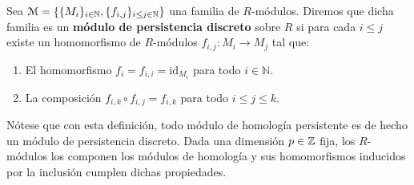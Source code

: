 \begin{definicion}
	Sea $\mathcal{M}= \{\{M_{i}\}_{i \in \mathbb{N}}, \{f_{i,j}\}_{i \leq j \in \mathbb{N}}\}$ una
	familia de $R$-módulos. Diremos que dicha familia es un \textbf{módulo de
		persistencia discreto} sobre $R$ si para cada $i \leq j$ existe un homomorfismo
	de $R$-módulos $f_{i,j}: M_{i} \to M_{j}$ tal que:
	\begin{enumerate}
		\item El homomorfismo $f_{i} = f_{i,i}= \mathrm{id}_{M_i}$ para todo $i \in \mathbb{N}$.
		
		\item La composición $f_{i,k}\circ f_{i,j}= f_{i,k}$ para todo $i \leq j \leq
		k$.
	\end{enumerate}
\end{definicion}
\begin{observacion}
	Nótese que con esta definición, todo módulo de homología persistente es de
	hecho un módulo de persistencia discreto. Dada una dimensión $p \in \mathbb{Z}$ fija,
	los $R$-módulos los componen los módulos de homología y sus homomorfismos
	inducidos por la inclusión cumplen dichas propiedades.
\end{observacion}

